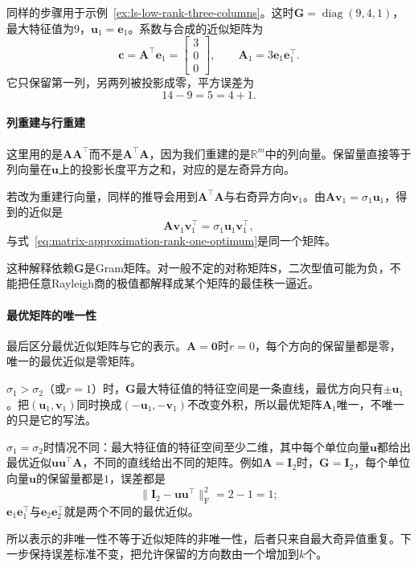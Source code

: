 同样的步骤用于示例~\ref{ex:ls-low-rank-three-columns}。这时$\bm G=\operatorname{diag}(9,4,1)$，最大特征值为$9$，$\bm u_1=\bm e_1$。系数与合成的近似矩阵为
\[
 \bm c=\bm A^\top\bm e_1=\begin{bmatrix}3\\0\\0\end{bmatrix},\qquad \bm A_1=3\bm e_1\bm e_1^\top .
\]
它只保留第一列，另两列被投影成零，平方误差为
\[
 14-9=5=4+1 .
\]

\paragraph{列重建与行重建}
这里用的是$\bm A\bm A^\top$而不是$\bm A^\top\bm A$，因为我们重建的是$\mathbb R^m$中的列向量。保留量直接等于列向量在$\bm u$上的投影长度平方之和，对应的是左奇异方向。

若改为重建行向量，同样的推导会用到$\bm A^\top\bm A$与右奇异方向$\bm v_1$。由$\bm A\bm v_1=\sigma_1\bm u_1$，得到的近似是
\[
 \bm A\bm v_1\bm v_1^\top=\sigma_1\bm u_1\bm v_1^\top ,
\]
与式~\eqref{eq:matrix-approximation-rank-one-optimum}是同一个矩阵。

这种解释依赖$\bm G$是Gram矩阵。对一般不定的对称矩阵$\bm S$，二次型值可能为负，不能把任意Rayleigh商的极值都解释成某个矩阵的最佳秩一逼近。

\paragraph{最优矩阵的唯一性}
最后区分最优近似矩阵与它的表示。$\bm A=\bm0$时$r=0$，每个方向的保留量都是零，唯一的最优近似是零矩阵。

$\sigma_1>\sigma_2$（或$r=1$）时，$\bm G$最大特征值的特征空间是一条直线，最优方向只有$\pm\bm u_1$。把$(\bm u_1,\bm v_1)$同时换成$(-\bm u_1,-\bm v_1)$不改变外积，所以最优矩阵$\bm A_1$唯一，不唯一的只是它的写法。

$\sigma_1=\sigma_2$时情况不同：最大特征值的特征空间至少二维，其中每个单位向量$\bm u$都给出最优近似$\bm u\bm u^\top\bm A$，不同的直线给出不同的矩阵。例如$\bm A=\bm I_2$时，$\bm G=\bm I_2$，每个单位向量$\bm u$的保留量都是$1$，误差都是
\[
 \lVert\bm I_2-\bm u\bm u^\top\rVert_{\mathrm F}^2=2-1=1 ;
\]
$\bm e_1\bm e_1^\top$与$\bm e_2\bm e_2^\top$就是两个不同的最优近似。

所以表示的非唯一性不等于近似矩阵的非唯一性，后者只来自最大奇异值重复。下一步保持误差标准不变，把允许保留的方向数由一个增加到$k$个。

